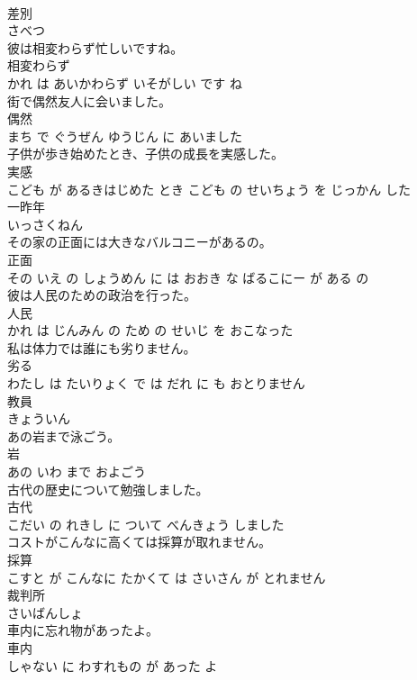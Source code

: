 \documentclass[8pt]{extreport}
\begin{document}
\begin{CJK}{UTF8}{min}
\\	差別	
\\	さべつ			
\\	彼は相変わらず忙しいですね。	
\\	相変わらず 
\\	かれ は あいかわらず いそがしい です ね			
\\	街で偶然友人に会いました。	
\\	偶然 
\\	まち で ぐうぜん ゆうじん に あいました			
\\	子供が歩き始めたとき、子供の成長を実感した。	
\\	実感 
\\	こども が あるきはじめた とき こども の せいちょう を じっかん した			
\\	一昨年	
\\	いっさくねん			
\\	その家の正面には大きなバルコニーがあるの。	
\\	正面 
\\	その いえ の しょうめん に は おおき な ばるこにー が ある の			
\\	彼は人民のための政治を行った。	
\\	人民 
\\	かれ は じんみん の ため の せいじ を おこなった			
\\	私は体力では誰にも劣りません。	
\\	劣る 
\\	わたし は たいりょく で は だれ に も おとりません			
\\	教員	
\\	きょういん			
\\	あの岩まで泳ごう。	
\\	岩 
\\	あの いわ まで およごう			
\\	古代の歴史について勉強しました。	
\\	古代 
\\	こだい の れきし に ついて べんきょう しました			
\\	コストがこんなに高くては採算が取れません。	
\\	採算 
\\	こすと が こんなに たかくて は さいさん が とれません			
\\	裁判所	
\\	さいばんしょ			
\\	車内に忘れ物があったよ。	
\\	車内 
\\	しゃない に わすれもの が あった よ			

\end{CJK}
\end{document}

